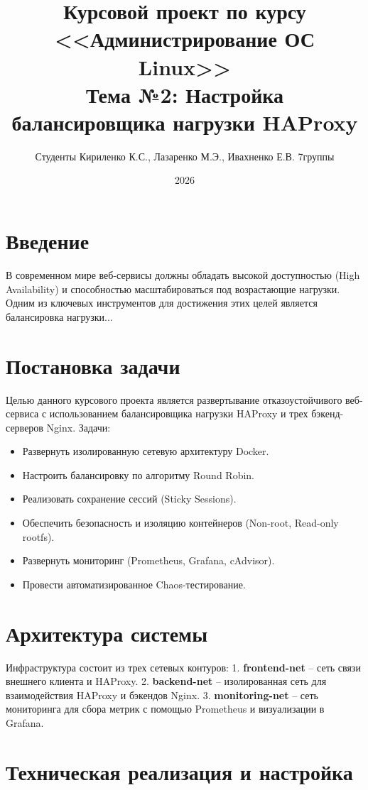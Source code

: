 \documentclass[12pt,a4paper]{article}
\title{Курсовой проект по курсу <<Администрирование ОС Linux>> \\
\large Тема №2: Настройка балансировщика нагрузки HAProxy}
\author{Студенты Кириленко К.С., Лазаренко М.Э., Ивахненко Е.В. 7группы}
\date{2026}
\begin{document}
\maketitle
\newpage

\tableofcontents
\newpage

\section{Введение}
В современном мире веб-сервисы должны обладать высокой доступностью (High Availability) и способностью масштабироваться под возрастающие нагрузки. Одним из ключевых инструментов для достижения этих целей является балансировка нагрузки...

\section{Постановка задачи}
Целью данного курсового проекта является развертывание отказоустойчивого веб-сервиса с использованием балансировщика нагрузки HAProxy и трех бэкенд-серверов Nginx. 
Задачи:
\begin{itemize}
    \item Развернуть изолированную сетевую архитектуру Docker.
    \item Настроить балансировку по алгоритму Round Robin.
    \item Реализовать сохранение сессий (Sticky Sessions).
    \item Обеспечить безопасность и изоляцию контейнеров (Non-root, Read-only rootfs).
    \item Развернуть мониторинг (Prometheus, Grafana, cAdvisor).
    \item Провести автоматизированное Chaos-тестирование.
\end{itemize}

\section{Архитектура системы}
Инфраструктура состоит из трех сетевых контуров:
1. \textbf{frontend-net} -- сеть связи внешнего клиента и HAProxy.
2. \textbf{backend-net} -- изолированная сеть для взаимодействия HAProxy и бэкендов Nginx.
3. \textbf{monitoring-net} -- сеть мониторинга для сбора метрик с помощью Prometheus и визуализации в Grafana.

\section{Техническая реализация и настройка}
\end{document}
